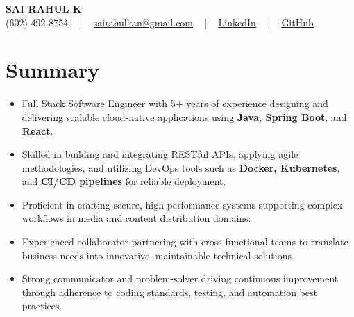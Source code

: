 \documentclass[letterpaper,11pt]{article}
\newcommand{\resumeItem}[1]{
  \item\footnotesize{
    {#1 \vspace{-2pt}}
  }
}
\newcommand{\resumeItemListStart}{\begin{itemize}[leftmargin=*]}
\newcommand{\resumeItemListEnd}{\end{itemize}\vspace{-5pt}}
\begin{document}
\begin{center}
    {\fontsize{14pt}{12pt}\selectfont \textbf{\MakeUppercase{Sai Rahul K}}}\\ \vspace{2pt}
    \fontsize{10pt}{12pt}\selectfont (602) 492-8754 ~ | ~ \href{mailto:sairahulkan@gmail.com}{sairahulkan@gmail.com} ~ | ~
    \href{https://www.linkedin.com/in/rq123/}{\color{blue}\underline{LinkedIn}} ~ | ~
    \href{https://github.com/kanrahuldo}{\color{blue}\underline{GitHub}}~
    \vspace{-8pt}
\end{center}

\section{Summary}
\fontsize{9pt}{10pt}\selectfont
\resumeItemListStart
    \resumeItem{Full Stack Software Engineer with 5+ years of experience designing and delivering scalable cloud-native applications using \textbf{Java, Spring Boot}, and \textbf{React}.} \vspace{-3pt}
    \resumeItem{Skilled in building and integrating RESTful APIs, applying agile methodologies, and utilizing DevOps tools such as \textbf{Docker, Kubernetes}, and \textbf{CI/CD pipelines} for reliable deployment.} \vspace{-3pt}
    \resumeItem{Proficient in crafting secure, high-performance systems supporting complex workflows in media and content distribution domains.} \vspace{-3pt}
    \resumeItem{Experienced collaborator partnering with cross-functional teams to translate business needs into innovative, maintainable technical solutions.} \vspace{-3pt}
    \resumeItem{Strong communicator and problem-solver driving continuous improvement through adherence to coding standards, testing, and automation best practices.} \vspace{-3pt}
\resumeItemListEnd
\vspace{-6pt}
\end{document}
